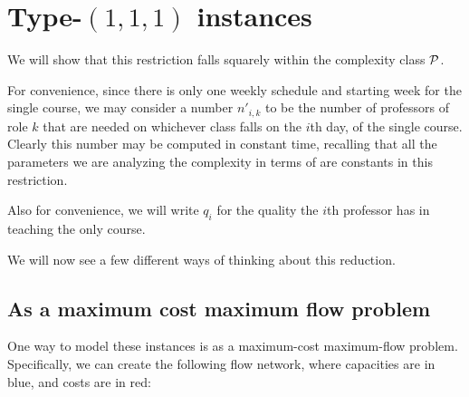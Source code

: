\section{Type-$(1, 1, 1)$ instances}
We will show that this restriction falls squarely within the complexity class $\mathcal{P}$.

For convenience, since there is only one weekly schedule and starting week for the single course, we may consider a number $n'_{i, k}$ to be the number of professors of role $k$ that are needed on whichever class falls on the $i$th day, of the single course. Clearly this number may be computed in constant time, recalling that all the parameters we are analyzing the complexity in terms of are constants in this restriction.

Also for convenience, we will write $q_i$ for the quality the $i$th professor has in teaching the only course.

We will now see a few different ways of thinking about this reduction.
\subsection{As a maximum cost maximum flow problem}

One way to model these instances is as a maximum-cost maximum-flow problem. Specifically, we can create the following flow network, where capacities are in blue, and costs are in red:

\begin{center}
\end{center}

